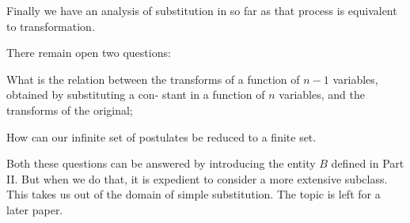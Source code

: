 \documentclass[9pt, twoside]{extarticle}
\newcommand{\td}[2][] {\todo[tickmarkheight=3pt, inline, size=\tiny, #1]{#2}}
\begin{document}
Finally we have an analysis of substitution in so far as that process is
equivalent to transformation.

There remain open two questions: \begin{enumerate*}[label=\arabic*)] \item What is the relation between the
  transforms of a function of \(n - 1\) variables, obtained by substituting a con-
  stant in a function of \(n\) variables, and the transforms of the original;
  \item How can our infinite set of postulates be reduced to a finite set. \end{enumerate*} Both
these questions can be answered by introducing the entity \(B\) defined in Part II.\td{link to part II}
But when we do that, it is expedient to consider a more extensive subclass.
This takes us out of the domain of simple substitution. The topic is left for
a later paper.
\end{document}
